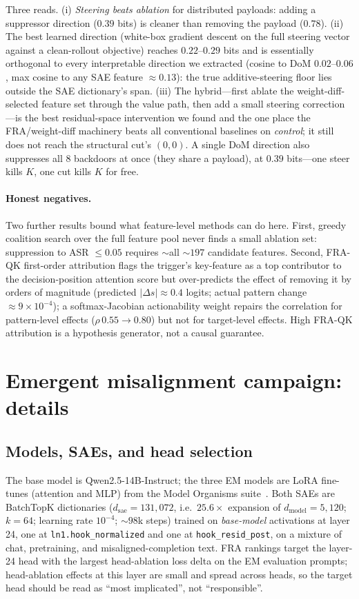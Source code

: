 \documentclass{article}
\theoremstyle{plain}
\theoremstyle{definition}
\theoremstyle{remark}
\newcommand{\dmodel}{d_{\mathrm{model}}}
\newcommand{\dsae}{d_{\mathrm{sae}}}
\begin{document}
Three reads. (i) \emph{Steering beats ablation} for distributed payloads: adding a suppressor direction ($0.39$ bits) is cleaner than removing the payload ($0.78$). (ii) The best learned direction (white-box gradient descent on the full steering vector against a clean-rollout objective) reaches $0.22$--$0.29$ bits and is essentially orthogonal to every interpretable direction we extracted (cosine to DoM $0.02$--$0.06$, max cosine to any SAE feature ${\approx}0.13$): the true additive-steering floor lies outside the SAE dictionary's span. (iii) The hybrid---first ablate the weight-diff-selected feature set through the value path, then add a small steering correction---is the best residual-space intervention we found and the one place the FRA/weight-diff machinery beats all conventional baselines on \emph{control}; it still does not reach the structural cut's $(0, 0)$. A single DoM direction also suppresses all 8 backdoors at once (they share a payload), at $0.39$ bits---one steer kills $K$, one cut kills $K$ for free.

\paragraph{Honest negatives.} Two further results bound what feature-level methods can do here. First, greedy coalition search over the full feature pool never finds a small ablation set: suppression to ASR $\le 0.05$ requires ${\sim}$all ${\sim}197$ candidate features. Second, FRA-QK first-order attribution flags the trigger's key-feature as a top contributor to the decision-position attention score but over-predicts the effect of removing it by orders of magnitude (predicted $|\Delta s| \approx 0.4$ logits; actual pattern change ${\approx}9\times10^{-4}$); a softmax-Jacobian actionability weight repairs the correlation for pattern-level effects ($\rho\,0.55 \to 0.80$) but not for target-level effects. High FRA-QK attribution is a hypothesis generator, not a causal guarantee.

\section{Emergent misalignment campaign: details}
\label{app:em_details}

\subsection{Models, SAEs, and head selection}
The base model is Qwen2.5-14B-Instruct; the three EM models are LoRA fine-tunes (attention and MLP) from the Model Organisms suite~\citep{turner2025modelorganisms}. Both SAEs are BatchTopK dictionaries ($\dsae = 131{,}072$, i.e.\ $25.6\times$ expansion of $\dmodel = 5{,}120$; $k = 64$; learning rate $10^{-4}$; ${\sim}98$k steps) trained on \emph{base-model} activations at layer 24, one at \texttt{ln1.hook\_normalized} and one at \texttt{hook\_resid\_post}, on a mixture of chat, pretraining, and misaligned-completion text. FRA rankings target the layer-24 head with the largest head-ablation loss delta on the EM evaluation prompts; head-ablation effects at this layer are small and spread across heads, so the target head should be read as ``most implicated'', not ``responsible''.
\end{document}
